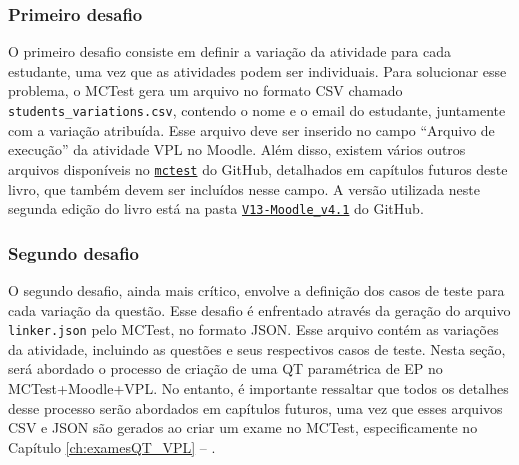 \subsubsection{Primeiro desafio}

O primeiro desafio consiste em definir a variação da atividade para cada estudante, uma vez que as atividades podem ser individuais. Para solucionar esse problema, o MCTest gera um arquivo no formato CSV chamado \verb|students_variations.csv|, contendo o nome e o email do estudante, juntamente com a variação atribuída. Esse arquivo deve ser inserido no campo ``Arquivo de execução'' da atividade VPL no Moodle. Além disso, existem vários outros arquivos disponíveis no \href{https://github.com/fzampirolli/mctest}{\texttt{mctest}} do GitHub, detalhados em capítulos futuros deste livro, que também devem ser incluídos nesse campo. A versão utilizada neste segunda edição do livro está na pasta \href{https://github.com/fzampirolli/mctest/tree/master/VPL_modification/V13-Moodle_v4.1}{\texttt{V13-Moodle\_v4.1}} do GitHub.


\subsubsection{Segundo desafio}

O segundo desafio, ainda mais crítico, envolve a definição dos casos de teste para cada variação da questão. Esse desafio é enfrentado através da geração do arquivo \verb|linker.json| pelo MCTest, no formato JSON. Esse arquivo contém as variações da atividade, incluindo as questões e seus respectivos casos de teste. Nesta seção, será abordado o processo de criação de uma QT paramétrica de EP no MCTest+Moodle+VPL. No entanto, é importante ressaltar que todos os detalhes desse processo serão abordados em capítulos futuros, uma vez que esses arquivos CSV e JSON são gerados ao criar um exame no MCTest, especificamente no Capítulo \ref{ch:examesQT_VPL} -- .

